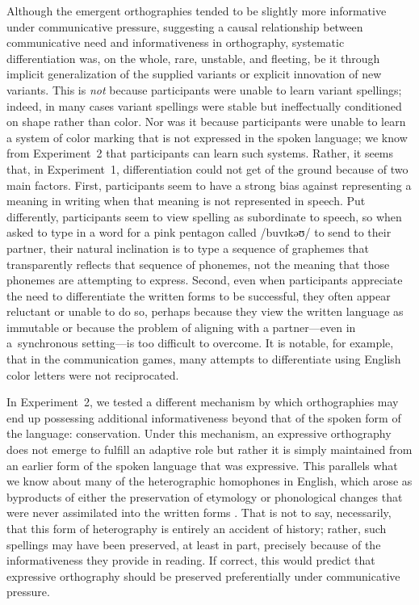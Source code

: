 \documentclass[doc,biblatex]{apa7}
\begin{document}
Although the emergent orthographies tended to be slightly more informative under communicative pressure, suggesting a causal relationship between communicative need and informativeness in orthography, systematic differentiation was, on the whole, rare, unstable, and fleeting, be it through implicit generalization of the supplied variants or explicit innovation of new variants. This is \textit{not} because participants were unable to learn variant spellings; indeed, in many cases variant spellings were stable but ineffectually conditioned on shape rather than color. Nor was it because participants were unable to learn a system of color marking that is not expressed in the spoken language; we know from Experiment~2 that participants can learn such systems. Rather, it seems that, in Experiment~1, differentiation could not get of the ground because of two main factors. First, participants seem to have a strong bias against representing a meaning in writing when that meaning is not represented in speech. Put differently, participants seem to view spelling as subordinate to speech, so when asked to type in a word for a pink pentagon called /buvɪkəʊ/ to send to their partner, their natural inclination is to type a sequence of graphemes that transparently reflects that sequence of phonemes, not the meaning that those phonemes are attempting to express. Second, even when participants appreciate the need to differentiate the written forms to be successful, they often appear reluctant or unable to do so, perhaps because they view the written language as immutable or because the problem of aligning with a partner---even in a~synchronous setting---is too difficult to overcome. It is notable, for example, that in the communication games, many attempts to differentiate using English color letters were not reciprocated.

In Experiment~2, we tested a different mechanism by which orthographies may end up possessing additional informativeness beyond that of the spoken form of the language: conservation. Under this mechanism, an expressive orthography does not emerge to fulfill an adaptive role but rather it is simply maintained from an earlier form of the spoken language that was expressive. This parallels what we know about many of the heterographic homophones in English, which arose as byproducts of either the preservation of etymology or phonological changes that were never assimilated into the written forms \parencite{Berg:2021}. That is not to say, necessarily, that this form of heterography is entirely an accident of history; rather, such spellings may have been preserved, at least in part, precisely because of the informativeness they provide in reading. If correct, this would predict that expressive orthography should be preserved preferentially under communicative pressure.
\end{document}
